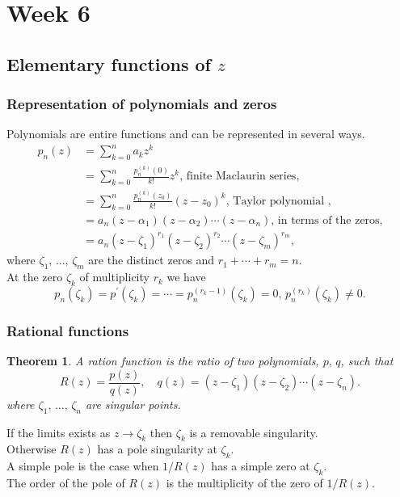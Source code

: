 \documentclass{article}
\newtheorem{theorem}{Theorem}
\begin{document}
\section{Week 6}
\subsection{Elementary functions of $z$}
\subsubsection{Representation of polynomials and zeros}
Polynomials are entire functions and can be represented in several ways.
\begin{align}
    p_n(z) &= \sum_{k=0}^n a_k z^k \nonumber \\
    &= \sum_{k=0}^n \frac{p_n^{(k)}(0)}{k!}z^k,\, \text{finite Maclaurin series}, \nonumber \\
    &= \sum_{k=0}^n \frac{p_n^{(k)}(z_0)}{k!}(z-z_0)^k,\, \text{Taylor polynomial }, \nonumber \\
    &= a_n(z-\alpha_1)(z-\alpha_2)\cdots(z-\alpha_n),\,\text{in terms of the zeros,} \nonumber \\
    &= a_n(z-\zeta_1)^{r_1}(z-\zeta_2)^{r_2}\cdots(z-\zeta_m)^{r_m}, \nonumber 
\end{align}
where $\zeta_1,\,\ldots,\,\zeta_m$ are the distinct zeros and $r_1+\cdots+r_m=n$.\\
At the zero $\zeta_k$ of multiplicity $r_k$ we have
\begin{equation}
    p_n(\zeta_k) = p^\prime(\zeta_k)=\cdots=p_n^{(r_k-1)}(\zeta_k)=0,\,p_n^{(r_k)}(\zeta_k)\neq0.
\end{equation}

\subsubsection{Rational functions}
\begin{theorem}
    A ration function is the ratio of two polynomials, $p,\,q$, such that
    \begin{equation}
        R(z)=\frac{p(z)}{q(z)},\quad q(z) = (z-\zeta_1)(z-\zeta_2)\cdots(z-\zeta_n).\label{eq:rational}
    \end{equation}
    where $\zeta_1,\,\ldots,\,\zeta_n$ are singular points.
\end{theorem}
If the limits exists as $z\to\zeta_k$ then $\zeta_k$ is a removable singularity.\\
Otherwise $R(z)$ has a pole singularity at $\zeta_k$. \\
A simple pole is the case when $1/R(z)$ has a simple zero at $\zeta_k$.\\
The order of the pole of $R(z)$ is the multiplicity of the zero of $1/R(z)$.
\end{document}
